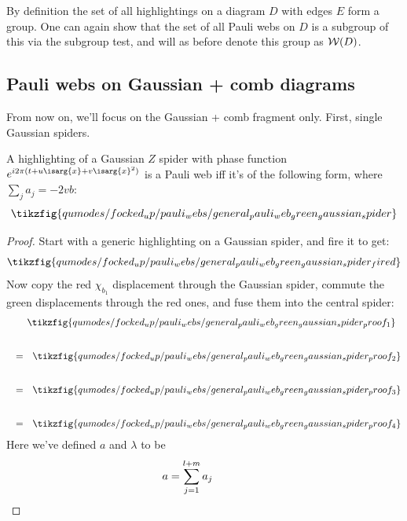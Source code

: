 By definition the set of all highlightings on a diagram $D$ with edges $E$ form a group.
One can again show that the set of all Pauli webs on $D$ is a subgroup of this via the subgroup test, and will as before denote this group as $\mathcal{W}(D)$.

\subsection{Pauli webs on Gaussian + comb diagrams}

From now on, we'll focus on the Gaussian + comb fragment only.
First, single Gaussian spiders.

\begin{proposition}\label{prop:general_pauli_web_green_gaussian_spider}
A highlighting of a Gaussian $Z$ spider with phase function $e^{i2\pi(t + u\isarg{x} + v\isarg{x}^2)}$ is a Pauli web iff it's of the following form, where $\sum_j a_j = -2vb$:
\begin{equation}\label{eq:general_pauli_web_green_gaussian_spider}
    \tikzfig{qumodes/focked_up/pauli_webs/general_pauli_web_green_gaussian_spider}
\end{equation}
\begin{proof}
    Start with a generic highlighting on a Gaussian spider, and fire it to get:
    \begin{equation}
        \tikzfig{qumodes/focked_up/pauli_webs/general_pauli_web_green_gaussian_spider_fired}
    \end{equation}
    Now copy the red $\chi_{b_1}$ displacement through the Gaussian spider, commute the green displacements through the red ones, and fuse them into the central spider:
    \begingroup
    \allowdisplaybreaks
    \begin{align}
        &\phantom{~~=~~} \tikzfig{qumodes/focked_up/pauli_webs/general_pauli_web_green_gaussian_spider_proof_1} \\[20pt]
        &~~=~~ \tikzfig{qumodes/focked_up/pauli_webs/general_pauli_web_green_gaussian_spider_proof_2} \\[20pt]
        &~~=~~ \tikzfig{qumodes/focked_up/pauli_webs/general_pauli_web_green_gaussian_spider_proof_3} \\[20pt]
        &~~=~~ \tikzfig{qumodes/focked_up/pauli_webs/general_pauli_web_green_gaussian_spider_proof_4}
    \end{align}
    \endgroup
    Here we've defined $a$ and $\lambda$ to be
    \begin{equation}
        a = \sum_{j=1}^{l+m} a_j
        \qqquad

\end{equation}
\end{proof}
\end{proposition}
